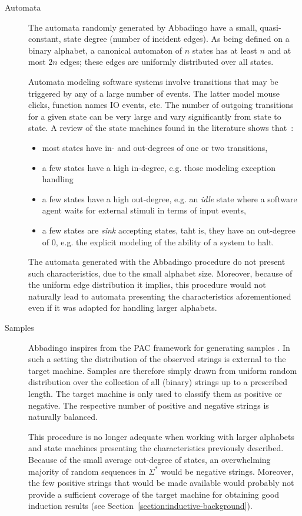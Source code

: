 \begin{description}
\item[Automata] The automata randomly generated by Abbadingo have a small, quasi-constant, state degree (number of incident edges). As being defined on a binary alphabet, a canonical automaton of $n$ states has at least $n$ and at most $2n$ edges; these edges are uniformly distributed over all states. 

Automata modeling software systems involve transitions that may be triggered by any of a large number of events. The latter model mouse clicks, function names IO events, etc. The number of outgoing transitions for a given state can be very large and vary significantly from state to state. A review of the state machines found in the literature shows that~\cite{Walkinshaw:2008}: 
\begin{itemize}
\item most states have in- and out-degrees of one or two transitions,
\item a few states have a high in-degree, e.g. those modeling exception handling
\item a few states have a high out-degree, e.g. an \emph{idle} state where a software agent waits for external stimuli in terms of input events,
\item a few states are \emph{sink} accepting states, taht is, they have an out-degree of 0, e.g. the explicit modeling of the ability of a system to halt.
\end{itemize}

The automata generated with the Abbadingo procedure do not present such characteristics, due to the small alphabet size. Moreover, because of the uniform edge distribution it implies, this procedure would not naturally lead to automata presenting the characteristics aforementioned even if it was adapted for handling larger alphabets.

\item[Samples] Abbadingo inspires from the PAC framework for generating samples \cite{Valiant:1984}. In such a setting the distribution of the observed strings is external to the target machine. Samples are therefore simply drawn from uniform random distribution over the collection of all (binary) strings up to a prescribed length. The target machine is only used to classify them as positive or negative. The respective number of positive and negative strings is naturally balanced.

This procedure is no longer adequate when working with larger alphabets and state machines presenting the characteristics previously described. Because of the small average out-degree of states, an overwhelming majority of random sequences in $\Sigma^*$ would be negative strings. Moreover, the few positive strings that would be made available would probably not provide a sufficient coverage of the target machine for obtaining good induction results (see Section~\ref{section:inductive-background}).


\end{description}
